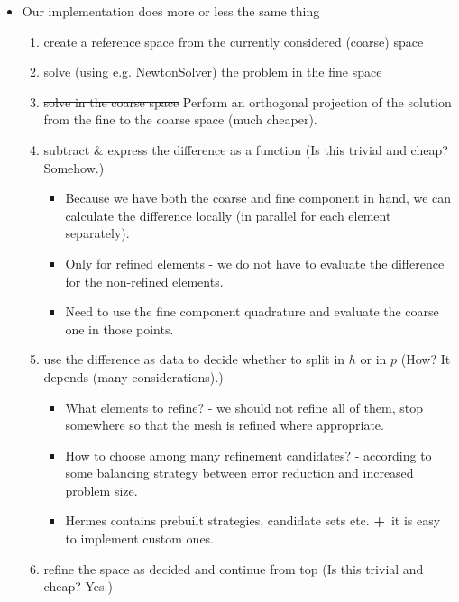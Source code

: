 \documentclass{beamer}
\begin{document}
\begin{frame}
\begin{itemize}
\item Our implementation does more or less the same thing
\begin{enumerate}
\item create a reference space from the currently considered (coarse) space
\item solve (using e.g. NewtonSolver) the problem in the fine space
\item \sout{solve in the coarse space} Perform an orthogonal projection of the solution from the fine to the coarse space (much cheaper).
\item subtract \& express the difference as a function (Is this trivial and cheap? \textcolor[rgb]{1,0,0}{Somehow.})
\begin{itemize}
\item Because we have both the coarse and fine component in hand, we can calculate the difference locally (in parallel for each element separately).
\item Only for refined elements - we do not have to evaluate the difference for the non-refined elements.
\item Need to use the fine component quadrature and evaluate the coarse one in those points.
\end{itemize}
\item use the difference as data to decide whether to split in $h$ or in $p$ (How? \textcolor[rgb]{1,0,0}{It depends (many considerations).})
\begin{itemize}
\item What elements to refine? - we should not refine all of them, stop somewhere so that the mesh is refined where appropriate.
\item How to choose among many refinement candidates? - according to some balancing strategy between error reduction and increased problem size.
\item Hermes contains prebuilt strategies, candidate sets etc. {\Large \textbf{+}}\   it is easy to implement custom ones.
\end{itemize}
\item refine the space as decided and continue from top (Is this trivial and cheap? \textcolor[rgb]{1,0,0}{Yes.})
\end{enumerate}
\end{itemize}
\end{frame}
\end{document}
